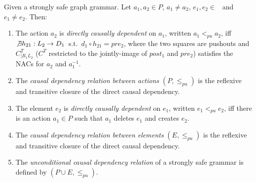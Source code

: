 \begin{definition}\label{def:unconditional-causal-dependency} Given \doublyTypedGraphGrammarCore{} a strongly safe graph grammar. Let $a_1, a_2 \in P$, $a_1 \ne a_2$, \mbox{$e_1, e_2 \in $ \coreGraph{}} and $e_1 \ne e_2$. Then: 

  \begin{enumerate}
    \item The action $a_2$ is \emph{directly causally dependent} on $a_1$, written $a_1 <_{pu} a_2$, iff \mbox{$\not\exists h_{21} : L_2 \rightarrow D_1$ s.t. \mbox{$d_1 \circ h_{21} = pre_2$}}, where the two squares are pushouts and $C^T_{|R_1L_2}$ ($C^T$ restricted to the jointly-image of $post_1$ and $pre_2$) satisfies the NACs for $a_2$ and $a_1^{-1}$.


   \item The \emph{causal dependency relation between actions} $(P, \leq_{pu})$ is the reflexive and transitive closure of the direct causal dependency.
   \item The element $e_2$ is \emph{directly causally dependent} on $e_1$, written $e_1 <_{pu} e_2$, iff there is an action $a_1 \in P$ such that $a_1$ deletes $e_1$ and creates $e_2$.
   \item The \emph{causal dependency relation between elements} $(E, \leq_{pu})$ is the reflexive and transitive closure of the direct causal dependency.
   \item The \emph{unconditional causal dependency relation} of a strongly safe grammar is defined by $(P \cup E, \leq_{pu})$.
  \end{enumerate}
\end{definition}

